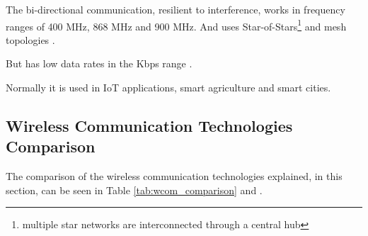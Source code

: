 The bi-directional communication, resilient to interference, works in frequency ranges of 400 MHz, 868 MHz and 900 MHz.
And uses Star-of-Stars\footnote{multiple star networks are interconnected through a central hub} \cite{WCOM10} and mesh topologies \cite{WCOM9}.

But has low data rates in the Kbps range \cite{WCOM8}.

Normally it is used in \gls{IoT} applications, smart agriculture and smart cities.

\subsection{Wireless Communication Technologies Comparison}
The comparison of the wireless communication technologies explained, in this section, can be seen in Table \ref{tab:wcom_comparison} \cite{WCOM11} and \cite{WCOM12}.
\begin{table}[H]
    \caption{Comparison of Communication Technologies}
    \label{tab:wcom_comparison}
\end{table}

